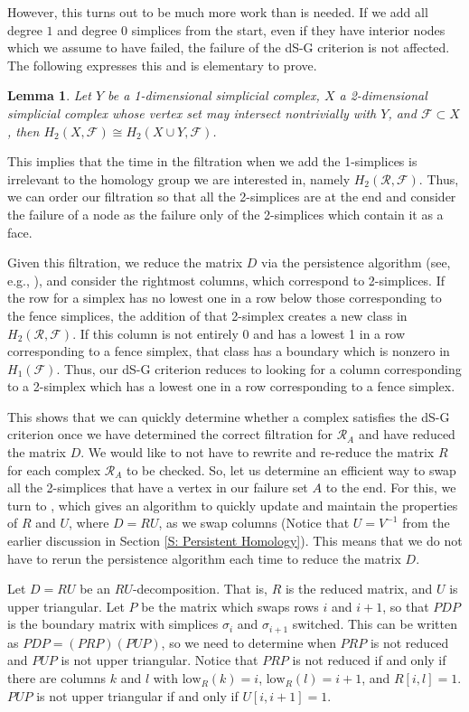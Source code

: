 \documentclass[10pt,twocolumn]{article} \usepackage{amsmath,epsf,amssymb,cite,pifont,amsthm, mathrsfs,epsfig,  bbm, amsthm,  setspace}
\newtheorem{lemma}{Lemma}
\newcommand{\FF}{\mathcal F}
\newcommand{\RR}{\mathcal R}
\newcommand{\iso}{\cong}
\newcommand{\inv}{^{-1}}
\renewcommand{\1}{\mathbbm{1}}
\newcommand{\low}{\textrm{low}}
\newcommand{\RF}{\mathcal{R},\mathcal{F}}
\begin{document}
However, this turns out to be much more work than is needed.
If we add all degree $1$ and degree 0 simplices from the start,
even if they have interior nodes which we assume
to have failed,  the failure of the dS-G criterion is not affected.
The following expresses this and is elementary to prove.
\begin{lemma}
Let $Y$ be a 1-dimensional simplicial complex,
$X$ a 2-dimensional simplicial complex whose vertex set may intersect nontrivially with $Y$, and $\FF\subset X$, then
$H_2(X,\FF) \iso H_2(X \cup Y,\FF)$.
	\label{L: Extra Frame Stuff}
\end{lemma}


This implies that the time in the filtration when we add the 1-simplices is irrelevant to the homology group we are interested in,
namely $H_2(\RF)$.
Thus, we can order our filtration so that all the 2-simplices are at the end
and consider the failure of a node as the failure only of the 2-simplices which contain it as a face.


Given this filtration, we reduce the matrix $D$ via the persistence algorithm (see, e.g., \cite{Edelsbrunner2010}),
and consider the rightmost columns, which correspond to 2-simplices.
If the row for a simplex has no lowest one in a row below those corresponding
to the fence simplices, the addition of that 2-simplex creates a new class in $H_2(\RR,\FF)$.
If this column is not entirely 0 and has a lowest 1 in a row corresponding to a fence simplex,
that class has a boundary which is nonzero in $H_1(\FF)$.
Thus, our dS-G criterion reduces to looking for a column corresponding to a 2-simplex which has a
lowest one in a row corresponding to a fence simplex.


This shows that we can quickly determine  whether a complex satisfies the dS-G criterion  once we have
determined the correct filtration for $\RR_A$ and have reduced the matrix $D$.
We would like to not have to rewrite and re-reduce the matrix $R$ for each complex $\RR_A$ to be checked.
So, let us determine an efficient way to swap all the 2-simplices that
have a vertex in our failure set $A$ to the end.
For this, we turn to \cite{Cohen-Steiner2006}, which gives an algorithm to quickly update and
maintain the properties of $R$ and $U$, where $D=RU$, as we swap columns (Notice that $U=V\inv$ from the earlier discussion in Section \ref{S: Persistent Homology}).
This means that we do not have to  rerun the persistence algorithm each time to reduce the matrix $D$.

Let $D=RU$ be an $RU$-decomposition.
That is, $R$ is the reduced matrix, and $U$ is upper triangular.
Let $P$ be the matrix which swaps rows $i$ and $i+1$, so that $PDP$ is the boundary matrix with simplices
$\sigma_i$ and $\sigma_{i+1}$ switched.
This can be written as $PDP=(PRP)(PUP)$, so we need to determine when $PRP$ is not reduced and
$PUP$ is not upper triangular.
Notice that $PRP$ is not reduced if and only if there are columns $k$ and $l$ with
$\low_R(k)=i$, $\low_R(l)=i+1$, and $R[i,l]=1$. $PUP$ is not upper triangular if and only if $U[i,i+1]=1$.
\end{document}
